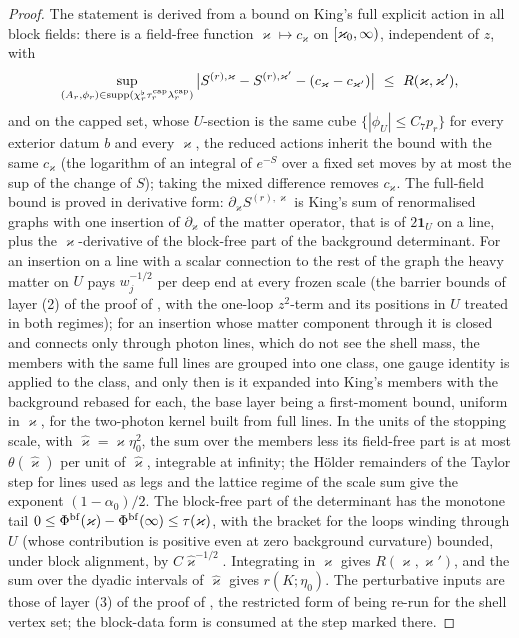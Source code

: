 \begin{proof}
The statement is derived from a bound on King's full explicit action in all block fields: there is a field-free function $\varkappa\mapsto c_\varkappa$ on $[\varkappa_0,\infty)$, independent of $z$, with
\[
\sup_{(A_r,\phi_r)\in\supp(\chi^\flat_r\tau^{\rm cap}_r\lambda^{\rm cap}_r)}\big|S^{(r),\varkappa}-S^{(r),\varkappa'}-(c_\varkappa-c_{\varkappa'})\big|\ \le\ R(\varkappa,\varkappa'),
\]
and on the capped set, whose $U$-section is the same cube $\{|\phi_U|\le C_7p_r\}$ for every exterior datum $b$ and every $\varkappa$, the reduced actions inherit the bound with the same $c_\varkappa$ (the logarithm of an integral of $e^{-S}$ over a fixed set moves by at most the sup of the change of $S$); taking the mixed difference removes $c_\varkappa$. The full-field bound is proved in derivative form: $\partial_\varkappa S^{(r),\varkappa}$ is King's sum of renormalised graphs with one insertion of $\partial_\varkappa$ of the matter operator, that is of $2\mathbf 1_U$ on a line, plus the $\varkappa$-derivative of the block-free part of the background determinant. For an insertion on a line with a scalar connection to the rest of the graph the heavy matter on $U$ pays $w_j^{-1/2}$ per deep end at every frozen scale (the barrier bounds of layer (2) of the proof of , with the one-loop $z^2$-term and its positions in $U$ treated in both regimes); for an insertion whose matter component through it is closed and connects only through photon lines, which do not see the shell mass, the members with the same full lines are grouped into one class, one gauge identity is applied to the class, and only then is it expanded into King's members with the background rebased for each, the base layer being a first-moment bound, uniform in $\varkappa$, for the two-photon kernel built from full lines. In the units of the stopping scale, with $\hat\varkappa=\varkappa\eta_0^2$, the sum over the members less its field-free part is at most $\theta(\hat\varkappa)$ per unit of $\hat\varkappa$, integrable at infinity; the H\"older remainders of the Taylor step for lines used as legs and the lattice regime of the scale sum give the exponent $(1-\alpha_0)/2$. The block-free part of the determinant has the monotone tail $0\le\Phi^{\rm bf}(\varkappa)-\Phi^{\rm bf}(\infty)\le\tau(\varkappa)$, with the bracket for the loops winding through $U$ (whose contribution is positive even at zero background curvature) bounded, under block alignment, by $C\hat\varkappa^{-1/2}$. Integrating in $\varkappa$ gives $R(\varkappa,\varkappa')$, and the sum over the dyadic intervals of $\hat\varkappa$ gives $r(K;\eta_0)$. The perturbative inputs are those of layer (3) of the proof of , the restricted form of \cite[(3.38)]{K1} being re-run for the shell vertex set; the block-data form is consumed at the step marked there.
\end{proof}

